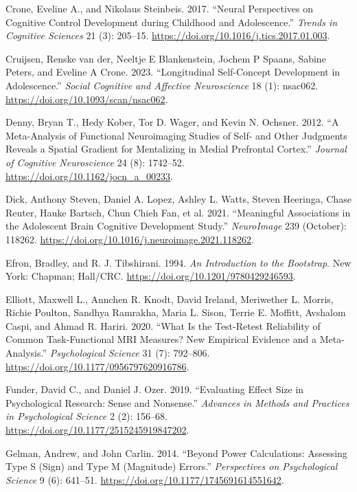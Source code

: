 \documentclass[
  letterpaper,
  DIV=11,
  numbers=noendperiod]{scrartcl}
\newlength{\cslhangindent}
\newenvironment{CSLReferences}[2] %
 {\begin{list}{}{%
  \setlength{\itemindent}{0pt}
  \setlength{\leftmargin}{0pt}
  \setlength{\parsep}{0pt}
  \ifodd #1
   \setlength{\leftmargin}{\cslhangindent}
   \setlength{\itemindent}{-1\cslhangindent}
  \fi
  \setlength{\itemsep}{#2\baselineskip}}}
 {\end{list}}
\begin{document}
\begin{CSLReferences}{1}{0}
Crone, Eveline A., and Nikolaus Steinbeis. 2017. {``Neural Perspectives
on Cognitive Control Development during Childhood and Adolescence.''}
\emph{Trends in Cognitive Sciences} 21 (3): 205--15.
\url{https://doi.org/10.1016/j.tics.2017.01.003}.

Cruijsen, Renske van der, Neeltje E Blankenstein, Jochem P Spaans,
Sabine Peters, and Eveline A Crone. 2023. {``Longitudinal Self-Concept
Development in Adolescence.''} \emph{Social Cognitive and Affective
Neuroscience} 18 (1): nsac062.
\url{https://doi.org/10.1093/scan/nsac062}.

Denny, Bryan T., Hedy Kober, Tor D. Wager, and Kevin N. Ochsner. 2012.
{``A Meta-Analysis of Functional Neuroimaging Studies of Self- and Other
Judgments Reveals a Spatial Gradient for Mentalizing in Medial
Prefrontal Cortex.''} \emph{Journal of Cognitive Neuroscience} 24 (8):
1742--52. \url{https://doi.org/10.1162/jocn_a_00233}.

Dick, Anthony Steven, Daniel A. Lopez, Ashley L. Watts, Steven Heeringa,
Chase Reuter, Hauke Bartsch, Chun Chieh Fan, et al. 2021. {``Meaningful
Associations in the Adolescent Brain Cognitive Development Study.''}
\emph{NeuroImage} 239 (October): 118262.
\url{https://doi.org/10.1016/j.neuroimage.2021.118262}.

Efron, Bradley, and R. J. Tibshirani. 1994. \emph{An Introduction to the
Bootstrap}. New York: Chapman; Hall/CRC.
\url{https://doi.org/10.1201/9780429246593}.

Elliott, Maxwell L., Annchen R. Knodt, David Ireland, Meriwether L.
Morris, Richie Poulton, Sandhya Ramrakha, Maria L. Sison, Terrie E.
Moffitt, Avshalom Caspi, and Ahmad R. Hariri. 2020. {``What Is the
Test-Retest Reliability of Common Task-Functional MRI Measures? New
Empirical Evidence and a Meta-Analysis.''} \emph{Psychological Science}
31 (7): 792--806. \url{https://doi.org/10.1177/0956797620916786}.

Funder, David C., and Daniel J. Ozer. 2019. {``Evaluating Effect Size in
Psychological Research: Sense and Nonsense.''} \emph{Advances in Methods
and Practices in Psychological Science} 2 (2): 156--68.
\url{https://doi.org/10.1177/2515245919847202}.

Gelman, Andrew, and John Carlin. 2014. {``Beyond Power Calculations:
Assessing Type S (Sign) and Type M (Magnitude) Errors.''}
\emph{Perspectives on Psychological Science} 9 (6): 641--51.
\url{https://doi.org/10.1177/1745691614551642}.


\end{CSLReferences}
\end{document}

